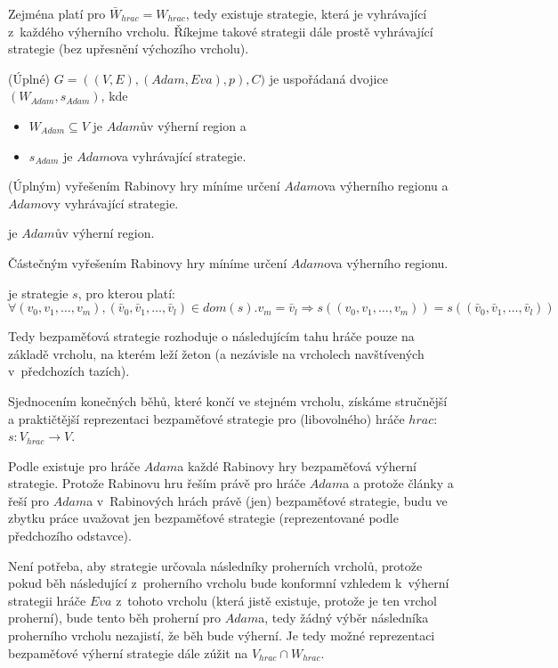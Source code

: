 Zejména platí pro $\bar{W}_{hrac} = W_{hrac}$, tedy existuje strategie, která je vyhrávající z~každého výherního vrcholu. Říkejme takové strategii dále prostě vyhrávající strategie (bez upřesnění výchozího vrcholu).
\begin{definition}
(Úplné)  $G = ((V, E), (Adam, Eva), p), C)$ je uspořádaná dvojice $(W_{Adam}, s_{Adam})$, kde
\begin{itemize}
\item $W_{Adam} \subseteq V$ je $Adam$ův výherní region a
\item $s_{Adam}$ je $Adam$ova vyhrávající strategie.
\end{itemize}
\end{definition}
(Úplným) vyřešením Rabinovy hry míníme určení $Adam$ova výherního regionu a $Adam$ovy vyhrávající strategie.
\begin{definition}
 je $Adam$ův výherní region.
\end{definition}
Částečným vyřešením Rabinovy hry míníme určení $Adam$ova výherního regionu.
\begin{definition}
 je strategie $s$, pro kterou platí: $\forall (v_0, v_1, \dotsc, v_m), (\bar{v}_0, \bar{v}_1, \dotsc, \bar{v}_l) \in dom(s). v_m = \bar{v}_l \Rightarrow s((v_0, v_1, \dotsc, v_m)) = s((\bar{v}_0, \bar{v}_1, \dotsc, \bar{v}_l))$
\end{definition}
\begin{informal}
Tedy bezpaměťová strategie rozhoduje o následujícím tahu hráče pouze na základě vrcholu, na kterém leží žeton (a nezávisle na vrcholech navštívených v~předchozích tazích).
\end{informal}

Sjednocením konečných běhů, které končí ve stejném vrcholu, získáme stručnější a praktičtější reprezentaci bezpaměťové strategie pro (libovolného) hráče $hrac$: $s: V_{hrac} \rightarrow V$.

Podle \cite[s.~2]{Piterman2006} existuje pro hráče $Adam$a každé Rabinovy hry bezpaměťová výherní strategie. Protože Rabinovu hru řeším právě pro hráče $Adam$a a protože články \cite{Piterman2006} a \cite{Horn2005} řeší pro $Adam$a v~Rabinových hrách právě (jen) bezpaměťové strategie, budu ve zbytku práce uvažovat jen bezpaměťové strategie (reprezentované podle předchozího odstavce).

Není potřeba, aby strategie určovala následníky proherních vrcholů, protože pokud běh následující z~proherního vrcholu bude konformní vzhledem k~výherní strategii hráče $Eva$ z~tohoto vrcholu (která jistě existuje, protože je ten vrchol proherní), bude tento běh proherní pro $Adam$a, tedy žádný výběr následníka proherního vrcholu nezajistí, že běh bude výherní. Je tedy možné reprezentaci bezpaměťové výherní strategie dále zúžit na $V_{hrac} \cap W_{hrac}$.